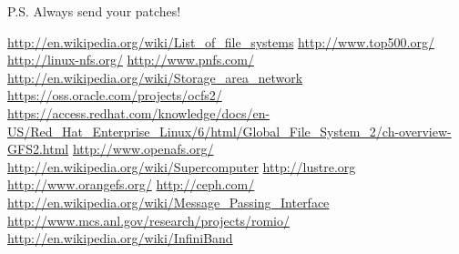 \documentclass[10pt, a5paper]{article}
\begin{document}
P.S. Always send your patches!

\begin{thebibliography}{9}
 {\href{http://en.wikipedia.org/wiki/List_of_file_systems}{http://en.wikipedia.org/wiki/List\_of\_file\_systems}}
 {\href{http://www.top500.org/}{http://www.top500.org/}}
 {\href{http://linux-nfs.org/}{http://linux-nfs.org/}}
 {\href{http://www.pnfs.com/}{http://www.pnfs.com/}}
 {\href{http://en.wikipedia.org/wiki/Storage_area_network}{http://en.wikipedia.org/wiki/Storage\_area\_network}}
 {\href{https://oss.oracle.com/projects/ocfs2/}{https://oss.oracle.com/projects/ocfs2/}}
 {\href{https://access.redhat.com/knowledge/docs/en-US/Red_Hat_Enterprise_Linux/6/html/Global_File_System_2/ch-overview-GFS2.html}{https://access.redhat.com/knowledge/docs/en-US/Red\_Hat\_Enterprise\_Linux/6/html/Global\_File\_System\_2/ch-overview-GFS2.html}}
 {\href{http://www.openafs.org/}{http://www.openafs.org/}}
 {\href{http://en.wikipedia.org/wiki/Supercomputer}{http://en.wikipedia.org/wiki/Supercomputer}}
 {\href{http://lustre.org/}{http://lustre.org}}
 {\href{http://www.orangefs.org/}{http://www.orangefs.org/}}
 {\href{http://ceph.com/}{http://ceph.com/}}
 {\href{http://en.wikipedia.org/wiki/Message_Passing_Interface}{http://en.wikipedia.org/wiki/Message\_Passing\_Interface}}
 {\href{http://www.mcs.anl.gov/research/projects/romio/}{http://www.mcs.anl.gov/research/projects/romio/}}
 {\href{http://en.wikipedia.org/wiki/InfiniBand}{http://en.wikipedia.org/wiki/InfiniBand}}\end{thebibliography}
\end{document}
